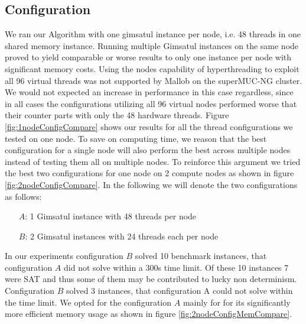 \documentclass[12pt,a4paper,twoside]{scrartcl}
\numberwithin{equation}{section}
\begin{document}
\subsection{Configuration}
We ran our Algorithm with one gimsatul instance per node, i.e. 48 threads in one shared memory instance. Running multiple Gimsatul instances on the same node proved to yield comparable or worse results to only one instance per node with significant memory costs. Using the nodes capability of hyperthreading to exploit all 96 virtual threads was not supported by Mallob on the superMUC-NG cluster. We would not expected an increase in performance in this case regardless, since in all cases the configurations utilizing all 96 virtual nodes performed worse that their counter parts with only the 48 hardware threads. Figure \ref{fig:1nodeConfigCompare} shows our results for all the thread configurations we tested on one node. To save on computing time, we reason that the best configuration for a single node will also perform the best across multiple nodes instead of testing them all on multiple nodes. To reinforce this argument we tried the best two configurations for one node on 2 compute nodes as shown in figure \ref{fig:2nodeConfigCompare}. In the following we will denote the two configurations as follows:
\begin{itemize}
  \item[$A$:] 1 Gimsatul instance with 48 threads per node
  \item[$B$:] 2 Gimsatul instances with 24 threads each per node
\end{itemize}
In our experiments configuration $B$ solved 10 benchmark instances, that configuration $A$ did not solve within a 300s time limit. Of these 10 instances 7 were SAT and thus some of them may be contributed to lucky non determinism. Configuration $B$ solved 3 instances, that configuration A could not solve within the time limit. We opted for the configuration $A$ mainly for for its significantly more efficient memory usage as shown in figure \ref{fig:2nodeConfigMemCompare}.
\end{document}

